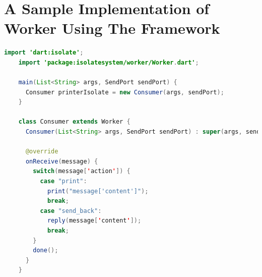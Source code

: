 \section{A Sample Implementation of Worker Using The Framework}
\begin{lstlisting}[language=java,firstnumber=1]
    import 'dart:isolate';
    import 'package:isolatesystem/worker/Worker.dart';

    main(List<String> args, SendPort sendPort) {
      Consumer printerIsolate = new Consumer(args, sendPort);
    }

    class Consumer extends Worker {
      Consumer(List<String> args, SendPort sendPort) : super(args, sendPort);

      @override
      onReceive(message) {
        switch(message['action']) {
          case "print":
            print("message['content']");
            break;
          case "send_back":
            reply(message['content']);
            break;
        }
        done();
      }
    }

\end{lstlisting}
